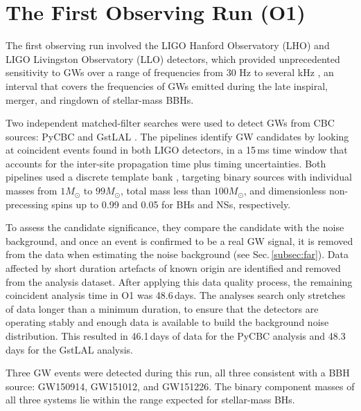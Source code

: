\documentclass[binding=0.6cm, LaM]{sapthesis}
\begin{document}
\section{The First Observing Run (O1)}
	The first observing run involved the LIGO Hanford Observatory (LHO) and LIGO Livingston Observatory (LLO) detectors, 
	which provided unprecedented sensitivity to GWs
	over a range of frequencies from 30 Hz to several kHz \cite{14}, an interval that  
	covers the frequencies of GWs emitted during 
	the late inspiral, merger, and ringdown of stellar-mass BBHs.

	Two independent matched-filter searches were used to detect GWs from CBC sources: 
	{\ttfamily PyCBC} \cite{109, 110, 111, 112} and {\ttfamily GstLAL} \cite{112, 113, 114}.
	The pipelines identify GW candidates by looking at coincident events 
	found in both LIGO detectors, in a 15\,ms time window 
	that accounts for the inter-site propagation time plus timing uncertainties. 
	Both pipelines used a discrete template bank \cite{42, 114, 115, 117, 118, 119, 120}, 
	targeting binary sources with individual masses from $1{M_\odot}$ to $99{M_\odot}$,
	total mass less than $100{M_\odot}$, and dimensionless non-precessing spins up to 0.99 and 0.05 for BHs and NSs, respectively.

	To assess the candidate significance, they compare the candidate with the noise background, 
	and once an event is confirmed to be a real GW signal, 
	it is removed from the data when estimating the noise background (see Sec.\,\ref{subsec:far}).
	Data affected by short duration artefacts of known origin are identified and removed from the analysis dataset.
	After applying this data quality process, the remaining coincident analysis time in O1 was 48.6\,days. 
	The analyses search only stretches of data longer than a minimum duration, 
	to ensure that the detectors are operating stably and enough data is available to build the background noise distribution.  
	This resulted in 46.1\,days of data for the {\ttfamily PyCBC} analysis and 48.3\,days for the {\ttfamily GstLAL} analysis.

	Three GW events were detected during this run, all three consistent with a BBH source: GW150914, GW151012, and GW151226.
	The binary component masses of all three systems lie 
	within the range expected for stellar-mass BHs. 
\end{document}

